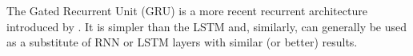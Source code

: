 

The Gated Recurrent Unit (GRU) is a more recent recurrent
architecture introduced by \textcite{cho2014learning}. It is
simpler than the LSTM and, similarly, can generally be used
as a substitute of RNN or LSTM layers with similar (or
better) results.
